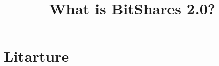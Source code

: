 \documentclass[conference,final,10pt,a4paper]{IEEEtran}
\title{What is BitShares 2.0?}
\begin{document}
\sloppy
\maketitle

\begin{abstract}
\end{abstract}
\section*   { Litarture                                      }


\end{document}
